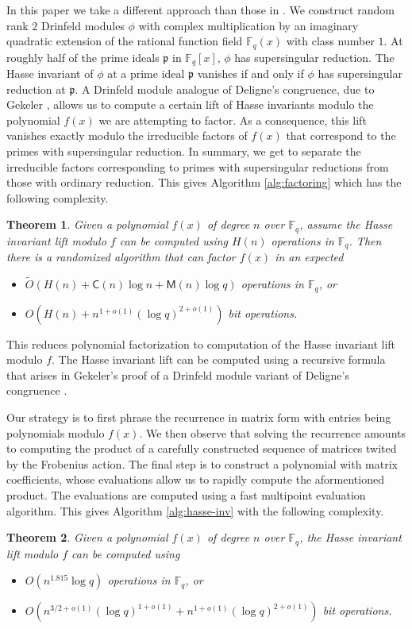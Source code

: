 \documentclass[12pt]{article}
\theoremstyle{plain}
\newtheorem{theorem}{Theorem}
\theoremstyle{definition}
\newcommand{\tildO}{\tilde{O}}
\def\F{\ensuremath{\mathbb{F}}}
\def\MM{\ensuremath{\mathsf{M}}}
\def\CC{\ensuremath{\mathsf{C}}}
\newcommand{\p}{\mathfrak p}
\begin{document}
In this paper we take a different approach than those in \cite{pp,vdH,nar}. We construct random 
rank $2$ Drinfeld modules $\phi$ with complex multiplication by an imaginary quadratic extension of 
the rational function field $\F_q(x)$  with class number $1$. At roughly half of the prime ideals 
$\p$ in $\F_q[x]$, $\phi$ has supersingular reduction. The Hasse invariant of $\phi$ at a prime 
ideal $\p$ vanishes if and only if $\phi$ has supersingular reduction at $\p$. A Drinfeld module 
analogue of Deligne's congruence, due to Gekeler \cite{gek}, allows us to compute a certain lift of 
Hasse invariants modulo the polynomial $f(x)$ we are attempting to factor. As a consequence, this 
lift vanishes exactly modulo the irreducible factors of $f(x)$ that correspond to the primes with 
supersingular reduction. In summary, we get to separate the irreducible factors corresponding to 
primes with supersingular reductions from those with ordinary reduction. This gives Algorithm 
\ref{alg:factoring} which has the following complexity.
\begin{theorem}
	\label{theo:main-factor}
	Given a polynomial $f(x)$ of degree $n$ over $\F_q$, assume the Hasse invariant lift modulo $f$ 
	can be computed using $H(n)$ operations in $\F_q$. Then there is a randomized algorithm that 
	can factor $f(x)$ in an expected 
	\begin{itemize}
		\item $\tildO(H(n) + \CC(n)\log n + \MM(n)\log q)$ operations in $\F_q$, or
		\item $O(H(n) + n^{1+o(1)}(\log q)^{2+o(1)})$ bit operations.
	\end{itemize}
\end{theorem}
This reduces polynomial factorization to computation of the Hasse invariant lift modulo $f$. The 
Hasse invariant lift can be computed using a recursive formula that arises in Gekeler's proof of a 
Drinfeld module variant of Deligne's congruence \cite{gek}.

Our strategy is to first phrase the 
recurrence in matrix form with entries being polynomials modulo $f(x)$. We then observe that 
solving the recurrence amounts to computing the product of a carefully constructed sequence of 
matrices twited by the Frobenius action. The final step is to construct a polynomial with matrix 
coefficients, whose evaluations allow us to rapidly compute the aformentioned product. The 
evaluations are computed using a fast multipoint evaluation algorithm. This gives Algorithm 
\ref{alg:hasse-inv} with the following complexity.
\begin{theorem}
	\label{theo:main-hasse}
	Given a polynomial $f(x)$ of degree $n$ over $\F_q$, the Hasse invariant lift modulo $f$ can be 
	computed using
	\begin{itemize}
		\item $O(n^{1.815}\log q)$ operations in $\F_q$, or
		\item $O(n^{3/2+o(1)} (\log q)^{1+o(1)} + n^{1+o(1)} (\log q)^{2+o(1)})$ bit operations.
	\end{itemize}
\end{theorem}
\end{document}

